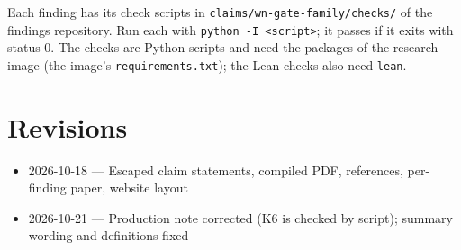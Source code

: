 \documentclass{article}
\begin{document}
Each finding has its check scripts in \texttt{claims/wn-gate-family/checks/} of the findings repository. Run each with \texttt{python -I <script>}; it passes if it exits with status 0. The checks are Python scripts and need the packages of the research image (the image's \texttt{requirements.txt}); the Lean checks also need \texttt{lean}.

\section{Revisions}

\begin{itemize}
\item 2026-10-18 --- Escaped claim statements, compiled PDF, references, per-finding paper, website layout
\item 2026-10-21 --- Production note corrected (K6 is checked by script); summary wording and definitions fixed
\end{itemize}



\end{document}
